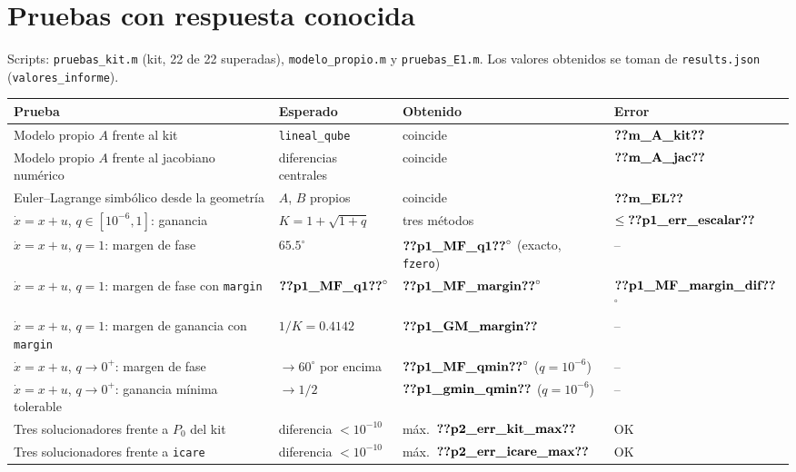 \section{Pruebas con respuesta conocida}\label{sec:pruebas}
Scripts: \texttt{pruebas\_kit.m} (kit, 22 de 22 superadas), \texttt{modelo\_propio.m} y
\texttt{pruebas\_E1.m}. Los valores obtenidos se toman de \texttt{results.json} (\texttt{valores\_informe}).

\begin{center}\small
\begin{tabularx}{\linewidth}{@{}X l l l@{}}
\toprule
Prueba & Esperado & Obtenido & Error \\
\midrule
Modelo propio $A$ frente al kit & \texttt{lineal\_qube} & coincide & $\V{m_A_kit}$ \\
Modelo propio $A$ frente al jacobiano numérico & diferencias centrales & coincide & $\V{m_A_jac}$ \\
Euler--Lagrange simbólico desde la geometría & $A$, $B$ propios & coincide & $\V{m_EL}$ \\
$\dot x=x+u$, $q\in[10^{-6},1]$: ganancia & $K=1+\sqrt{1+q}$ & tres métodos & $\le\V{p1_err_escalar}$ \\
$\dot x=x+u$, $q=1$: margen de fase & $65.5^\circ$ & $\V{p1_MF_q1}^\circ$ (exacto, \texttt{fzero}) & -- \\
$\dot x=x+u$, $q=1$: margen de fase con \texttt{margin} & $\V{p1_MF_q1}^\circ$ & $\V{p1_MF_margin}^\circ$ & $\V{p1_MF_margin_dif}$\,$^\circ$ \\
$\dot x=x+u$, $q=1$: margen de ganancia con \texttt{margin} & $1/K=0.4142$ & $\V{p1_GM_margin}$ & -- \\
$\dot x=x+u$, $q\to0^+$: margen de fase & $\to60^\circ$ por encima & $\V{p1_MF_qmin}^\circ$ ($q=10^{-6}$) & -- \\
$\dot x=x+u$, $q\to0^+$: ganancia mínima tolerable & $\to1/2$ & $\V{p1_gmin_qmin}$ ($q=10^{-6}$) & -- \\
Tres solucionadores frente a $P_0$ del kit & diferencia $<10^{-10}$ & máx.\ $\V{p2_err_kit_max}$ & OK \\
Tres solucionadores frente a \texttt{icare} & diferencia $<10^{-10}$ & máx.\ $\V{p2_err_icare_max}$ & OK \\
\bottomrule
\end{tabularx}
\end{center}
